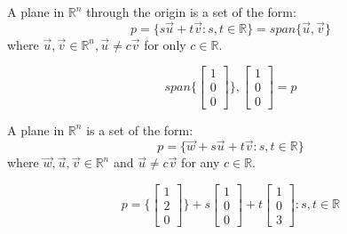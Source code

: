 \documentclass[11pt]{article}
\theoremstyle{plain}
\theoremstyle{remark}
\theoremstyle{plain}
\newcommand{\rn}{\mathbb{R}}
\begin{document}
\begin{tcolorbox}[colback=green!5!white,colframe=green!75!black,title= Definition]
    A plane in $\rn^n$ through the origin is a set of the form:
    \[p=\{s\overrightarrow{u}+t\overrightarrow{v}:s,t\in\rn\}=span\{\overrightarrow{u}, \overrightarrow{v}\}\]
    where $\overrightarrow{u}, \overrightarrow{v}\in\rn^n, \overrightarrow{u}\neq c\overrightarrow{v}$ for only $c\in\rn$.
\end{tcolorbox}   

\begin{tcolorbox}[colback=magenta!5!white,colframe=magenta!75!black,title= Example]
    \[span\{\begin{bmatrix}
        1\\0\\0
    \end{bmatrix}\}, \begin{bmatrix}
        1\\0\\0
    \end{bmatrix}=p\]
\end{tcolorbox}   

\begin{tcolorbox}[colback=green!5!white,colframe=green!75!black,title= Definition]
    A plane in $\rn^n$ is a set of the form:
    \[p=\{\overrightarrow{w}+s\overrightarrow{u}+t\overrightarrow{v}:s,t\in\rn\}\]
    where $\overrightarrow{w},\overrightarrow{u},\overrightarrow{v}\in\rn^n$ and $\overrightarrow{u}\neq c\overrightarrow{v}$ for any $c\in\rn$.
\end{tcolorbox} 

\begin{tcolorbox}[colback=magenta!5!white,colframe=magenta!75!black,title= Example]
    \[p=\{\begin{bmatrix}
        1\\2\\0
    \end{bmatrix}\}+s\begin{bmatrix}
        1\\0\\0
    \end{bmatrix}+t\begin{bmatrix}
        1\\0\\3
    \end{bmatrix}:s,t\in\rn\]
\end{tcolorbox}   
\end{document}
